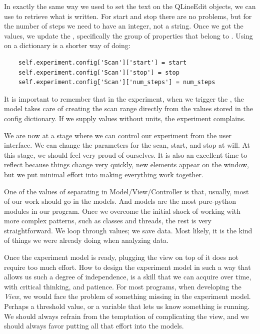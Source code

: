 In exactly the same way we used  to set the text on the QLineEdit objects, we can use  to retrieve what is written. For start and stop there are no problems, but for the number of steps we need to have an integer, not a string. Once we got the values, we update the , specifically the group of properties that belong to . Using  on a dictionary is a shorter way of doing:

\begin{verbatim}
    self.experiment.config['Scan']['start'] = start
    self.experiment.config['Scan']['stop'] = stop
    self.experiment.config['Scan']['num_steps'] = num_steps
\end{verbatim}

It is important to remember that in the experiment, when we trigger the , the model takes care of creating the scan range directly from the values stored in the config dictionary. If we supply values without units, the experiment complains.



We are now at a stage where we can control our experiment from the user interface. We can change the parameters for the scan, start, and stop at will. At this stage, we should feel very proud of ourselves. It is also an excellent time to reflect because things change very quickly, new elements appear on the window, but we put minimal effort into making everything work together.

One of the values of separating in Model/View/Controller is that, usually, most of our work should go in the models. And models are the most pure-python modules in our program. Once we overcome the initial shock of working with more complex patterns, such as classes and threads, the rest is very straightforward. We loop through values; we save data. Most likely, it is the kind of things we were already doing when analyzing data.

Once the experiment model is ready, plugging the view on top of it does not require too much effort. How to design the experiment model in such a way that allows us such a degree of independence, is a skill that we can acquire over time, with critical thinking, and patience. For most programs, when developing the \emph{View}, we would face the problem of something missing in the experiment model. Perhaps a threshold value, or a variable that lets us know something is running. We should always refrain from the temptation of complicating the view, and we should always favor putting all that effort into the models.

